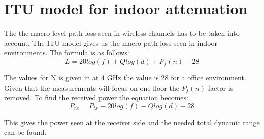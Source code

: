 \section{ITU model for indoor attenuation}
The the macro level path loss seen in wireless channels has to be taken into account. The ITU model gives us the macro path loss seen in indoor environments. The formula is as follows:
\begin{equation}
L = 20log (f) + Q log (d) + P_f(n) - 28
\end{equation}

\begin{where}
\end{where}

The values for N is given in \citep{ITU_indoor} at 4 GHz the value is 28 for a office environment. Given that the measurements will focus on one floor the $P_f(n)$ factor is removed. To find the received power the equation becomes:
\begin{equation}
P_{rx} = P_{tx} - 20log(f) - Q log (d) +28
\label{total_prx}
\end{equation}
\begin{where}
\end{where}
This gives the power seen at the receiver side and the needed  total dynamic range can be found.

